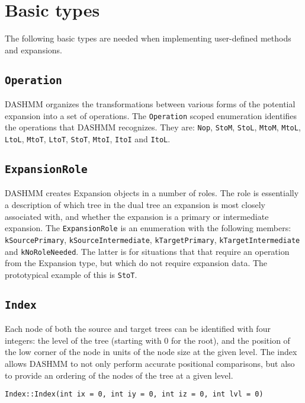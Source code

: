 \section{Basic types}

The following basic types are needed when implementing user-defined methods and
expansions.

\subsection{\texttt{Operation}}

DASHMM organizes the transformations between various forms of the potential
expansion into a set of operations. The \texttt{Operation} scoped enumeration
identifies the operations that DASHMM recognizes. They are: \texttt{Nop},
\texttt{StoM}, \texttt{StoL}, \texttt{MtoM}, \texttt{MtoL}, \texttt{LtoL},
\texttt{MtoT}, \texttt{LtoT}, \texttt{StoT}, \texttt{MtoI}, \texttt{ItoI}
and \texttt{ItoL}.

\subsection{\texttt{ExpansionRole}}

DASHMM creates Expansion objects in a number of roles. The role is essentially
a description of which tree in the dual tree an expansion is most closely
associated with, and whether the expansion is a primary or intermediate
expansion.  The \texttt{ExpansionRole} is an enumeration with the following
members: \texttt{kSourcePrimary}, \texttt{kSourceIntermediate},
\texttt{kTargetPrimary}, \texttt{kTargetIntermediate} and
\texttt{kNoRoleNeeded}. The latter is for situations that that require an
operation from the Expansion type, but which do not require expansion data.
The prototypical example of this is \texttt{StoT}.

\subsection{\texttt{Index}}

Each node of both the source and target trees can be identified with four
integers: the level of the tree (starting with 0 for the root), and the
position of the low corner of the node in units of the node size at the given
level. The index allows DASHMM to not only perform accurate positional
comparisons, but also to provide an ordering of the nodes of the tree at a
given level.

\begin{lstlisting}
Index::Index(int ix = 0, int iy = 0, int iz = 0, int lvl = 0)
\end{lstlisting}


